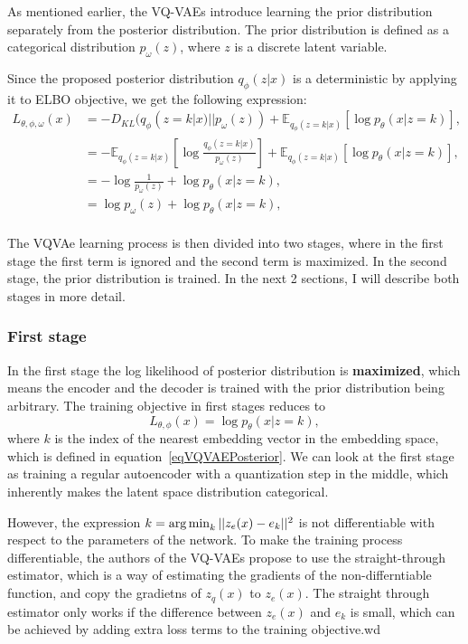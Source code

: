 As mentioned earlier, the VQ-VAEs introduce learning the prior distribution separately from the posterior distribution. The prior distribution is defined as a categorical distribution $p_{\omega}(z)$, where $z$ is a discrete latent variable.\cite{vqvae}

Since the proposed posterior distribution $q_{\phi}(z|x)$ is a deterministic by applying it to ELBO objective, we get the following expression:
\begin{equation}
    \begin{split}
        L_{\theta, \phi, \omega}(x) &= - D_{KL}(q_{\phi}(z = k|x) || p_{\omega}(z)) + \mathbb{E}_{q_{\phi}(z=k|x)} [\log p_{\theta}(x|z = k)],\\
                            &= - \mathbb{E}_{q_{\phi}(z=k|x)} [\log \frac{q_{\phi}(z=k|x)}{p_{\omega}(z)}] + \mathbb{E}_{q_{\phi}(z=k|x)} [\log p_{\theta}(x|z = k)],\\
                            &= - \log \frac{1}{p_{\omega}(z)} + \log p_{\theta}(x|z = k),\\
                            &= \log p_{\omega}(z) + \log p_{\theta}(x|z = k),\\
    \end{split}
\end{equation}

The VQVAe learning process is then divided into two stages, where in the first stage the first term is ignored and the second term is maximized. In the second stage, the prior distribution is trained. In the next 2 sections, I will describe both stages in more detail.

\subsubsection{First stage}

In the first stage the log likelihood of posterior distribution is \textbf{maximized}, which means the encoder and the decoder is trained with the prior distribution being arbitrary. The training objective in first stages reduces to 
\[ L_{\theta, \phi}(x) = \log p_{\theta}(x|z = k), \]
where $k$ is the index of the nearest embedding vector in the embedding space, which is defined in equation~\ref{eqVQVAEPosterior}. We can look at the first stage as training a regular autoencoder with a quantization step in the middle, which inherently makes the latent space distribution categorical.\cite{vqvae}
    
However, the expression $k = \operatorname*{arg\,min}_{k} || z_e(x) - e_k ||^2$ is not differentiable with respect to the parameters of the network. To make the training process differentiable, the authors of the VQ-VAEs propose to use the straight-through estimator, which is a way of estimating the gradients of the non-differntiable function, and copy the gradietns of $z_q(x)$ to $z_e(x)$.\cite{vqvae} The straight through estimator only works if the difference between $z_e(x)$ and $e_k$ is small, which can be achieved by adding extra loss terms to the training objective.wd\cite{straight_through}

